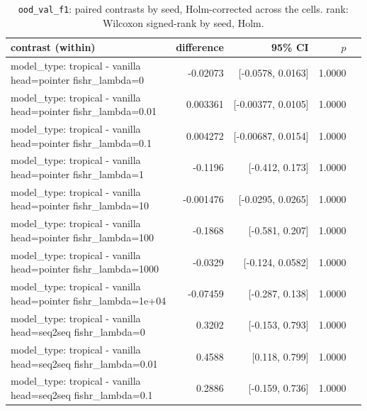 \documentclass[10pt]{article}
\makeatletter
\newcommand{\stackcell}[1]{\begin{tabular}[t]{@{}l@{}}#1\end{tabular}}
\makeatother
\begin{document}
{\small
\begin{longtable}{lrrrl}
\caption{\texttt{ood\_val\_f1}: paired contrasts by seed, Holm-corrected across the cells. rank: Wilcoxon signed-rank by seed, Holm.}\label{tab:paired-ood_val_f1}\\
\toprule
contrast (within) & difference & 95\% CI & $p$ & \\
\midrule
\endhead
\stackcell{model\_type: tropical - vanilla\\\footnotesize head=pointer fishr\_lambda=0 } & -0.02073 & [-0.0578, 0.0163] & 1.0000 & \\
\stackcell{model\_type: tropical - vanilla\\\footnotesize head=pointer fishr\_lambda=0.01 } & 0.003361 & [-0.00377, 0.0105] & 1.0000 & \\
\stackcell{model\_type: tropical - vanilla\\\footnotesize head=pointer fishr\_lambda=0.1 } & 0.004272 & [-0.00687, 0.0154] & 1.0000 & \\
\stackcell{model\_type: tropical - vanilla\\\footnotesize head=pointer fishr\_lambda=1 } & -0.1196 & [-0.412, 0.173] & 1.0000 & \\
\stackcell{model\_type: tropical - vanilla\\\footnotesize head=pointer fishr\_lambda=10 } & -0.001476 & [-0.0295, 0.0265] & 1.0000 & \\
\stackcell{model\_type: tropical - vanilla\\\footnotesize head=pointer fishr\_lambda=100 } & -0.1868 & [-0.581, 0.207] & 1.0000 & \\
\stackcell{model\_type: tropical - vanilla\\\footnotesize head=pointer fishr\_lambda=1000 } & -0.0329 & [-0.124, 0.0582] & 1.0000 & \\
\stackcell{model\_type: tropical - vanilla\\\footnotesize head=pointer fishr\_lambda=1e+04 } & -0.07459 & [-0.287, 0.138] & 1.0000 & \\
\stackcell{model\_type: tropical - vanilla\\\footnotesize head=seq2seq fishr\_lambda=0 } & 0.3202 & [-0.153, 0.793] & 1.0000 & \\
\stackcell{model\_type: tropical - vanilla\\\footnotesize head=seq2seq fishr\_lambda=0.01 } & 0.4588 & [0.118, 0.799] & 1.0000 & \\
\stackcell{model\_type: tropical - vanilla\\\footnotesize head=seq2seq fishr\_lambda=0.1 } & 0.2886 & [-0.159, 0.736] & 1.0000 & \\

\end{longtable}}
\end{document}
